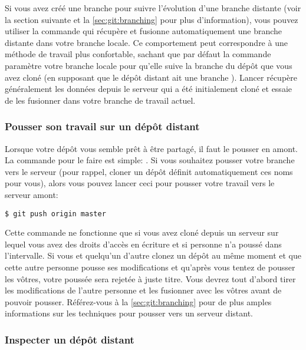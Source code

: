 Si vous avez créé une branche pour suivre l'évolution d'une branche distante (voir
la section suivante et la \autoref{sec:git:branching} pour plus d'information), vous pouvez utiliser la commande  qui récupère et fusionne automatiquement une branche distante dans votre branche locale.
Ce comportement peut correspondre à une méthode de travail plus confortable, sachant que par défaut la commande  paramètre votre branche locale pour qu'elle suive la branche  du dépôt que vous avez cloné (en supposant que le dépôt distant ait une branche ).
Lancer  récupère généralement les données depuis le serveur qui a été initialement cloné et essaie de les fusionner dans votre branche de travail actuel.

\subsubsection{Pousser son travail sur un dépôt distant}
\label{sec:git:pushing_remotes}

Lorsque votre dépôt vous semble prêt à être partagé, il faut le pousser en amont.
La commande pour le faire est simple: .
Si vous souhaitez pousser votre branche  vers le serveur  (pour rappel, cloner un dépôt définit automatiquement ces noms pour vous), alors vous pouvez lancer ceci pour pousser votre travail vers le serveur amont:
\begin{Schunk}
\begin{Verbatim}
$ git push origin master
\end{Verbatim}
\end{Schunk}

Cette commande ne fonctionne que si vous avez cloné depuis un serveur sur lequel vous avez des droits d'accès en écriture et si personne n'a poussé dans l'intervalle.
Si vous et quelqu'un d'autre clonez un dépôt au même moment et que cette autre personne pousse ses modifications et qu'après vous tentez de pousser les vôtres, votre poussée sera rejetée à juste titre.
Vous devrez tout d'abord tirer les modifications de l'autre personne et les fusionner avec les vôtres avant de pouvoir pousser.
Référez-vous à la \autoref{sec:git:branching} pour de plus amples informations sur les techniques pour pousser vers un serveur distant.

\subsubsection{Inspecter un dépôt distant}
\label{sec:git:inspecting_remote}

